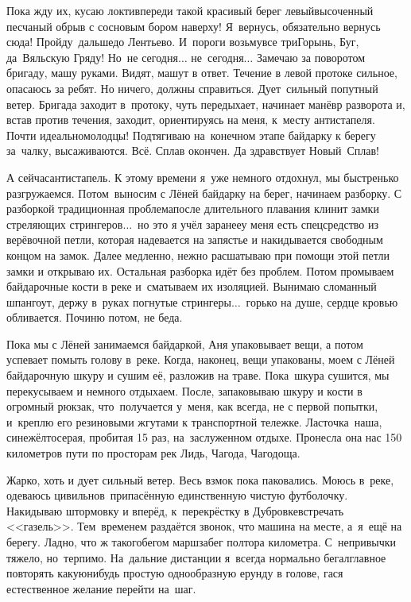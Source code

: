 Пока жду их, кусаю локти\mdash впереди такой красивый берег левый\mdash высоченный песчаный обрыв с сосновым бором наверху! Я~вернусь, обязательно вернусь сюда! Пройду~дальше\mdash до Лентьево. И~пороги возьму\mdash все три\mdash Горынь, Буг, да~Вяльскую Гряду! Но~не сегодня$\ldots$ не~сегодня$\ldots$ 
\newpage
Замечаю за поворотом бригаду, машу руками. Видят, машут в ответ. Течение в левой протоке сильное, опасаюсь за ребят. Но ничего, должны справиться. Дует~сильный попутный ветер. Бригада заходит в~протоку, чуть передыхает, начинает манёвр разворота и, встав против течения, заходит, ориентируясь на меня, к~месту антистапеля. Почти идеально\mdash  молодцы! Подтягиваю на~конечном этапе байдарку к берегу за~чалку, высаживаются. Всё. Сплав окончен. Да здравствует Новый~Сплав! 

А сейчас\mdash антистапель. К этому времени я~уже немного отдохнул, мы быстренько разгружаемся. Потом~выносим с Лёней байдарку на берег, начинаем разборку. С разборкой традиционная проблема\mdash после длительного плавания клинит замки стреляющих стрингеров$\ldots$~но это я учёл заранее\mdash у меня есть спецсредство из верёвочной петли, которая надевается на запястье и накидывается свободным концом на замок. Далее медленно, нежно расшатываю при помощи этой петли замки и открываю их. Остальная разборка идёт без проблем. Потом промываем байдарочные кости в реке и~сматываем их изоляцией. Вынимаю сломанный шпангоут, держу в~руках погнутые стрингеры$\ldots$~горько на душе, сердце кровью обливается. Починю потом, не беда. 

Пока мы с Лёней занимаемся байдаркой, Аня упаковывает вещи, а потом успевает помыть голову в~реке. Когда, наконец, вещи упакованы, моем с Лёней байдарочную шкуру и сушим её, разложив на траве. Пока~шкура сушится, мы перекусываем и немного отдыхаем. После, запаковываю шкуру и кости в огромный рюкзак, что~получается у~меня, как всегда, не с первой попытки, и~креплю его резиновыми жгутами к транспортной тележке. Ласточка~наша, сине\sdash жёлто\sdash серая, пробитая 15 раз, на~заслуженном отдыхе. Пронесла она нас 150 километров пути по просторам рек Лидь, Чагода, Чагодоща. 

Жарко, хоть и дует сильный ветер. Весь взмок пока паковались. Моюсь в~реке, одеваюсь цивильно\mdash в~припасённую единственную чистую футболочку. Накидываю штормовку и вперёд, к~перекрёстку в Дубровке\mdash встречать <<газель>>. Тем~временем раздаётся звонок, что машина на месте, а~я~ещё на берегу. Ладно, что ж такого\mdash бегом марш\mdash забег полтора километра. С~непривычки тяжело, но~терпимо. На~дальние дистанции я~всегда нормально бегал\mdash главное повторять какую\sdash нибудь простую однообразную ерунду в голове, гася естественное желание перейти на~шаг. 

